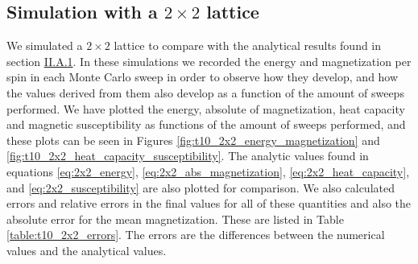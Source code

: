 \documentclass[reprint,english,notitlepage]{revtex4-1}  %
\begin{document}
\subsection{Simulation with a $2\times 2$ lattice} \label{sec:IV:B}

We simulated a $2 \times 2$ lattice to compare with the analytical results found in section \hyperref[sec:II:A:i]{II.A.1}. In these simulations we recorded the energy and magnetization per spin in each Monte Carlo sweep in order to observe how they develop, and how the values derived from them also develop as a function of the amount of sweeps performed. We have plotted the energy, absolute of magnetization, heat capacity and magnetic susceptibility as functions of the amount of sweeps performed, and these plots can be seen in Figures \ref{fig:t10_2x2_energy_magnetization} and \ref{fig:t10_2x2_heat_capacity_susceptibility}. The analytic values found in equations \eqref{eq:2x2_energy}, \eqref{eq:2x2_abs_magnetization}, \eqref{eq:2x2_heat_capacity}, and \eqref{eq:2x2_susceptibility} are also plotted for comparison. We also calculated errors and relative errors in the final values for all of these quantities and also the absolute error for the mean magnetization. These are listed in Table \ref{table:t10_2x2_errors}. The errors are the differences between the numerical values and the analytical values.
\end{document}
